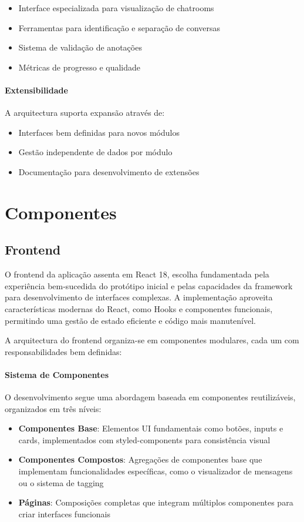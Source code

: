 \begin{itemize}
    \item Interface especializada para visualização de chatrooms
    \item Ferramentas para identificação e separação de conversas
    \item Sistema de validação de anotações
    \item Métricas de progresso e qualidade
\end{itemize}

\paragraph{Extensibilidade}
A arquitectura suporta expansão através de:

\begin{itemize}
    \item Interfaces bem definidas para novos módulos
    \item Gestão independente de dados por módulo
    \item Documentação para desenvolvimento de extensões
\end{itemize}

\section{Componentes}

\subsection{Frontend}

O frontend da aplicação assenta em React 18, escolha fundamentada pela experiência bem-sucedida do protótipo inicial e pelas capacidades da framework para desenvolvimento de interfaces complexas. A implementação aproveita características modernas do React, como Hooks e componentes funcionais, permitindo uma gestão de estado eficiente e código mais manutenível.

A arquitectura do frontend organiza-se em componentes modulares, cada um com responsabilidades bem definidas:

\paragraph{Sistema de Componentes}
O desenvolvimento segue uma abordagem baseada em componentes reutilizáveis, organizados em três níveis:

\begin{itemize}
    \item \textbf{Componentes Base}: Elementos UI fundamentais como botões, inputs e cards, implementados com styled-components para consistência visual
    \item \textbf{Componentes Compostos}: Agregações de componentes base que implementam funcionalidades específicas, como o visualizador de mensagens ou o sistema de tagging
    \item \textbf{Páginas}: Composições completas que integram múltiplos componentes para criar interfaces funcionais
\end{itemize}

